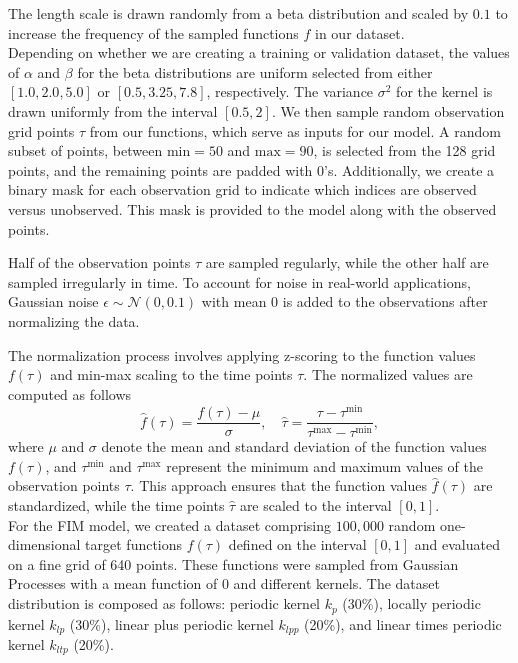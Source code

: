 \documentclass{article}
\theoremstyle{plain}
\theoremstyle{definition}
\theoremstyle{remark}
\begin{document}
The length scale is drawn randomly from a beta distribution and scaled by $0.1$ to increase the frequency of the sampled functions $f$ in our dataset.\\
Depending on whether we are creating a training or validation dataset, the values of \(\alpha\) and \(\beta\) for the beta distributions are uniform selected from either \([1.0, 2.0, 5.0]\) or \([0.5, 3.25, 7.8]\), respectively. The variance \(\sigma^2\) for the kernel is drawn uniformly from the interval \([0.5, 2]\).
We then sample random observation grid points \(\tau\) from our functions, which serve as inputs for our model. A random subset of points, between \(\text{min}=50\) and \(\text{max}=90\), is selected from the 128 grid points, and the remaining points are padded with \(0\)'s. Additionally, we create a binary mask for each observation grid to indicate which indices are observed versus unobserved. This mask is provided to the model along with the observed points.

Half of the observation points \(\tau\) are sampled regularly, while the other half are sampled irregularly in time. To account for noise in real-world applications, Gaussian noise \(\epsilon \sim \mathcal{N}(0, 0.1)\) with mean \(0\) is added to the observations after normalizing the data.

The normalization process involves applying z-scoring to the function values \(f(\tau)\) and min-max scaling to the time points \(\tau\). The normalized values are computed as follows
\[
\hat{f}(\tau) = \frac{f(\tau) - \mu}{\sigma}, \quad \hat{\tau} = \frac{\tau - \tau^{\text{min}}}{\tau^{\text{max}} - \tau^{\text{min}}},
\]
where \(\mu\) and \(\sigma\) denote the mean and standard deviation of the function values \(f(\tau)\), and \(\tau^{\text{min}}\) and \(\tau^{\text{max}}\) represent the minimum and maximum values of the observation points \(\tau\). This approach ensures that the function values \(\hat{f}(\tau)\) are standardized, while the time points \(\hat{\tau}\) are scaled to the interval \([0, 1]\).
\\
For the FIM model, we created a dataset comprising \(100{,}000\) random one-dimensional target functions \(f(\tau)\) defined on the interval \([0, 1]\) and evaluated on a fine grid of 640 points. These functions were sampled from Gaussian Processes with a mean function of \(0\) and different kernels. The dataset distribution is composed as follows: periodic kernel \(k_p\) (30\%), locally periodic kernel \(k_{lp}\) (30\%), linear plus periodic kernel \(k_{lpp}\) (20\%), and linear times periodic kernel \(k_{ltp}\) (20\%).
\end{document}
